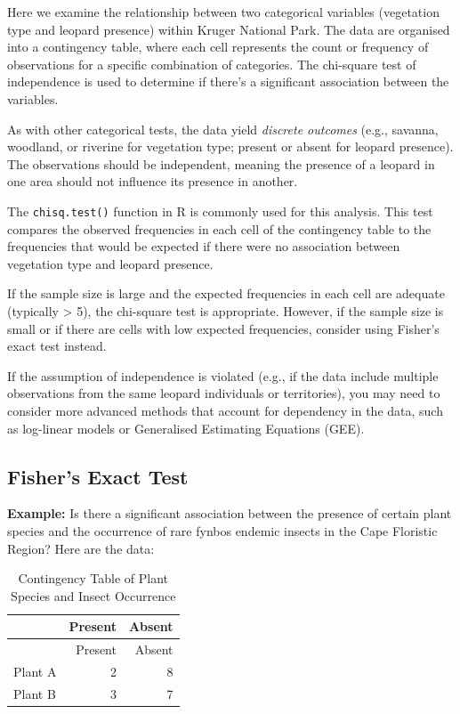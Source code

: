 \documentclass[
  letterpaper,
]{book}
\begin{document}
Here we examine the relationship between two categorical variables
(vegetation type and leopard presence) within Kruger National Park. The
data are organised into a contingency table, where each cell represents
the count or frequency of observations for a specific combination of
categories. The chi-square test of independence is used to determine if
there's a significant association between the variables.

As with other categorical tests, the data yield \emph{discrete outcomes}
(e.g., savanna, woodland, or riverine for vegetation type; present or
absent for leopard presence). The observations should be independent,
meaning the presence of a leopard in one area should not influence its
presence in another.

The \texttt{chisq.test()} function in R is commonly used for this
analysis. This test compares the observed frequencies in each cell of
the contingency table to the frequencies that would be expected if there
were no association between vegetation type and leopard presence.

If the sample size is large and the expected frequencies in each cell
are adequate (typically \textgreater{} 5), the chi-square test is
appropriate. However, if the sample size is small or if there are cells
with low expected frequencies, consider using Fisher's exact test
instead.

If the assumption of independence is violated (e.g., if the data include
multiple observations from the same leopard individuals or territories),
you may need to consider more advanced methods that account for
dependency in the data, such as log-linear models or Generalised
Estimating Equations (GEE).

\subsection{Fisher's Exact Test}\label{fishers-exact-test}

\textbf{Example:} Is there a significant association between the
presence of certain plant species and the occurrence of rare fynbos
endemic insects in the Cape Floristic Region? Here are the data:

\begin{longtable}[]{@{}lrr@{}}
\caption{Contingency Table of Plant Species and Insect
Occurrence}\tabularnewline
\toprule\noalign{}
& Present & Absent \\
\midrule\noalign{}
\endfirsthead
\toprule\noalign{}
& Present & Absent \\
\midrule\noalign{}
\endhead
\bottomrule\noalign{}
\endlastfoot
Plant A & 2 & 8 \\
Plant B & 3 & 7 \\
\end{longtable}
\end{document}
